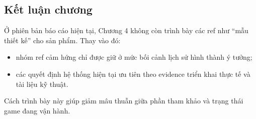 \subsection{Kết luận chương}
\label{subsec:rw-summary}

Ở phiên bản báo cáo hiện tại, Chương 4 không còn trình bày các ref như ``mẫu thiết kế'' cho sản phẩm. Thay vào đó:
\begin{itemize}
    \item nhóm ref cảm hứng chỉ được giữ ở mức bối cảnh lịch sử hình thành ý tưởng;
    \item các quyết định hệ thống hiện tại ưu tiên theo evidence triển khai thực tế và tài liệu kỹ thuật.
\end{itemize}

Cách trình bày này giúp giảm mâu thuẫn giữa phần tham khảo và trạng thái game đang vận hành.
